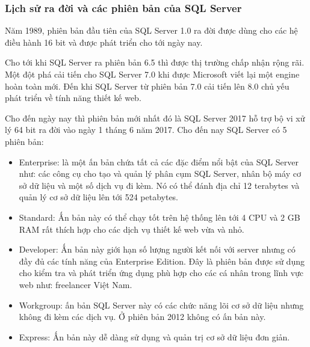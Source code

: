 \subsubsection{Lịch sử ra đời và các phiên bản của SQL Server}
Năm 1989, phiên bản đầu tiên của SQL Server 1.0 ra đời được dùng cho các hệ điều hành 16 bit và được phát triển cho tới ngày nay.
\par
Cho tới khi SQL Server ra phiên bản 6.5 thì được thị trường chấp nhận rộng rãi. Một đột phá cải tiến cho SQL Server 7.0 khi được Microsoft viết lại một engine hoàn toàn mới. Đến khi SQL Server từ phiên bản 7.0 cải tiến lên 8.0 chủ yếu phát triển về tính năng thiết kế web.
\par
Cho đến ngày nay thì phiên bản mới nhất đó là SQL Server 2017 hỗ trợ bộ vi xử lý 64 bit ra đời vào ngày 1 tháng 6 năm 2017. Cho đến nay SQL Server có 5 phiên bản:
\begin{itemize}
\item 	Enterprise: là một ấn bản chứa tất cả các đặc điểm nổi bật của SQL Server như: các công cụ cho tạo và quản lý phân cụm SQL Server, nhân bộ máy cơ sở dữ liệu và một số dịch vụ đi kèm. Nó có thể đánh địa chỉ 12 terabytes và quản lý cơ sở dữ liệu lên tới 524 petabytes.
\item 	Standard: Ấn bản này có thể chạy tốt trên hệ thống lên tới 4 CPU và 2 GB RAM rất thích hợp cho các dịch vụ thiết kế web vừa và nhỏ.
\item	Developer: Ấn bản này giới hạn số lượng người kết nối với server nhưng có đầy đủ các tính năng của Enterprise Edition. Đây là phiên bản được sử dụng cho kiểm tra và phát triển ứng dụng phù hợp cho các cá nhân trong lĩnh vực web như: freelancer Việt Nam.
\item	Workgroup: ấn bản SQL Server này có các chức năng lõi cơ sở dữ liệu nhưng không đi kèm các dịch vụ. Ở phiên bản 2012 không có ấn bản này.
\item	Express: Ấn bản này dễ dàng sử dụng và quản trị cơ sở dữ liệu đơn giản.
\end{itemize}
